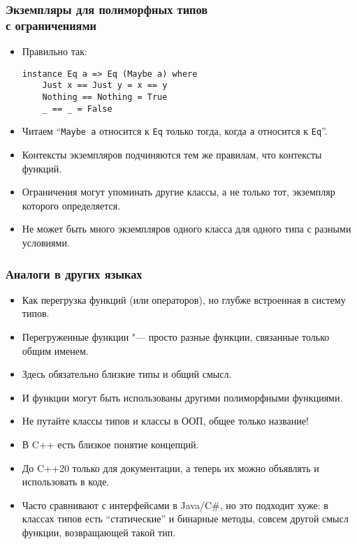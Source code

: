 \documentclass[10pt]{beamer}
\begin{document}
\begin{frame}[fragile]
\frametitle{Экземпляры для полиморфных типов \\с ограничениями}
\begin{itemize}
    \item Правильно так:
\begin{lstlisting}
instance Eq a => Eq (Maybe a) where
    Just x == Just y = x == y
    Nothing == Nothing = True
    _ == _ = False
\end{lstlisting} 
    \item Читаем \enquote{\lstinline|Maybe a| относится к \lstinline|Eq| только тогда, когда \lstinline|a| относится к \lstinline|Eq|}.
    \item Контексты экземпляров подчиняются тем же правилам, что контексты функций.
    \item Ограничения могут упоминать другие классы, а не только тот, экземпляр которого определяется.
    \item Не может быть много экземпляров одного класса для одного типа с разными условиями.
\end{itemize}
\end{frame}

\begin{frame}[fragile]
\frametitle{Аналоги в других языках}
\begin{itemize}
    \item Как перегрузка функций (или операторов), но глубже встроенная в систему типов.
    \item Перегруженные функции "--- просто разные функции, связанные только общим именем.
    \item Здесь обязательно близкие типы и общий смысл.
    \item И функции могут быть использованы другими полиморфными функциями. \pause
    \item Не путайте классы типов и классы в ООП, общее только название!
    \item В C++ есть близкое понятие концепций. \pause
    \item До C++20 только для документации\pause, а теперь их можно объявлять и использовать в коде. \pause
    \item Часто сравнивают с интерфейсами в Java/C\#, но это подходит хуже: \pause в классах типов есть \enquote{статические} и бинарные методы, совсем другой смысл функции, возвращающей такой тип.
\end{itemize}
\end{frame}
\end{document}
